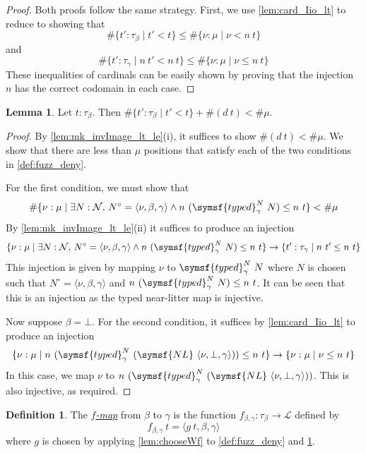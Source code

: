 \documentclass{article}
\newcommand{\cdef}[3]{\href{https://leanprover-community.github.io/con-nf/doc/ConNF/#1.html\#ConNF.#2}{\emph{#3}}}
\theoremstyle{definition}
\newtheorem{definition}{Definition}[section]
\newtheorem{lemma}[theorem]{Lemma}
\theoremstyle{remark}
\begin{document}
\begin{proof}
    Both proofs follow the same strategy.
    First, we use \cref{lem:card_Iio_lt} to reduce to showing that
    \[ \#\{ t' : \tau_\beta \mid t' < t \} \leq \#\{ \nu : \mu \mid \nu < n\ t \} \]
    and
    \[ \#\{ t' : \tau_\gamma \mid n\ t' < n\ t \} \leq \#\{ \nu : \mu \mid \nu \leq n\ t \} \]
    These inequalities of cardinals can be easily shown by proving that the injection \( n \) has the correct codomain in each case.
\end{proof}
\begin{lemma}
    \label{lem:mk_fuzz_deny}
    Let \( t : \tau_\beta \).
    Then \( \#\{ t' : \tau_\beta \mid t' < t \} + \#(d\ t) < \#\mu \).
\end{lemma}
\begin{proof}
    By \cref{lem:mk_invImage_lt_le}(i), it suffices to show \( \#(d\ t) < \#\mu \).
    We show that there are less than \( \mu \) positions that satisfy each of the two conditions in \cref{def:fuzz_deny}.

    For the first condition, we must show that
    \[ \#\{ \nu : \mu \mid \exists N : \mathcal N,\, N^\circ = \langle \nu, \beta, \gamma \rangle \wedge n\ (\symsf{typed}^N_\gamma\ N) \leq n\ t \} < \#\mu \]
    By \cref{lem:mk_invImage_lt_le}(ii) it suffices to produce an injection
    \[ \{ \nu : \mu \mid \exists N : \mathcal N,\, N^\circ = \langle \nu, \beta, \gamma \rangle \wedge n\ (\symsf{typed}^N_\gamma\ N) \leq n\ t \} \to \{ t' : \tau_\gamma \mid n\ t' \leq n\ t \} \]
    This injection is given by mapping \( \nu \) to \( \symsf{typed}^N_\gamma\ N \) where \( N \) is chosen such that \( N^\circ = \langle \nu, \beta, \gamma \rangle \) and \( n\ (\symsf{typed}^N_\gamma\ N) \leq n\ t \).
    It can be seen that this is an injection as the typed near-litter map is injective.

    Now suppose \( \beta = \bot \).
    For the second condition, it suffices by \cref{lem:card_Iio_lt} to produce an injection
    \[ \{ \nu : \mu \mid n\ (\symsf{typed}^N_\gamma\ (\symsf{NL}\ \langle \nu, \bot, \gamma \rangle)) \leq n\ t \} \to \{ \nu : \mu \mid \nu \leq n\ t \} \]
    In this case, we map \( \nu \) to \( n\ (\symsf{typed}^N_\gamma\ (\symsf{NL}\ \langle \nu, \bot, \gamma \rangle)) \).
    This is also injective, as required.
\end{proof}
\begin{definition}
    The \cdef{Fuzz/Construction}{fuzz}{\( f \)-map} from \( \beta \) to \( \gamma \) is the function \( f_{\beta,\gamma} : \tau_\beta \to \mathcal L \) defined by
    \[ f_{\beta,\gamma}\ t = \langle g\ t, \beta, \gamma \rangle \]
    where \( g \) is chosen by applying \cref{lem:chooseWf} to \cref{def:fuzz_deny} and \cref{lem:mk_fuzz_deny}.
\end{definition}
\end{document}
